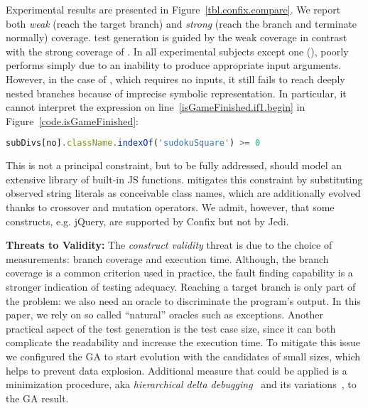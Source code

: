 Experimental results are presented in Figure~\ref{tbl.confix.compare}. We report both \emph{weak} (reach the target branch) and \emph{strong} (reach the branch and terminate normally) coverage. \Confix test generation is guided by the weak coverage in contrast with the strong coverage of \Jedi. In all experimental subjects except one (), \Confix poorly performs simply due to an inability to produce appropriate input arguments. However, in the case of , which requires no inputs, it still fails to reach deeply nested branches because of imprecise symbolic representation. In particular, it cannot interpret the expression on line~\ref{isGameFinished.if1.begin} in Figure~\ref{code.isGameFinished}:
\begin{center}
\begin{lstlisting}[style=htmlcssjs,language=JavaScript,basicstyle={\footnotesize\ttfamily},backgroundcolor=\color{white},frame=none,numbers=none,xleftmargin={0.2cm}]
subDivs[no].className.indexOf('sudokuSquare') >= 0
\end{lstlisting}
\end{center}
This is not a principal constraint, but to be fully addressed, \Confix should model an extensive library of built-in JS functions. \Jedi mitigates this constraint by substituting observed string literals as conceivable class names, which are additionally evolved thanks to crossover and mutation operators. We admit, however, that some constructs, e.g. jQuery, are supported by Confix but not by Jedi.\\

\textbf{Threats to Validity:}
The \emph{construct validity} threat is due to the choice of measurements: branch coverage and execution time. Although, the branch coverage is a common criterion used in practice, the fault finding capability is a stronger indication of testing adequacy. Reaching a target branch is only part of the problem: we also need an oracle to discriminate the program's output. In this paper, we rely on so called ``natural'' oracles such as exceptions.
Another practical aspect of the test generation is the test case size, since it can both complicate the readability and increase the execution time. To mitigate this issue we configured the GA to start evolution with the candidates of small sizes, which helps to prevent data explosion. Additional measure that could be applied is a minimization procedure, aka \emph{hierarchical delta debugging}~\cite{misherghi2006hdd} and its variations~\cite{herfert2017automatically}, to the GA result.

